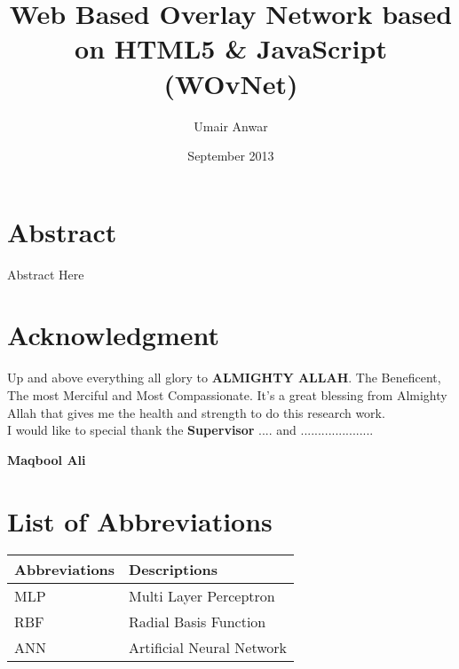 \documentclass[12pt,a4paper,oneside]{book} %
\title{Web Based Overlay Network based on HTML5 \& JavaScript (WOvNet)}
\author{Umair Anwar}
\date{{September 2013}}
\begin{document}
\maketitle


\chapter*{Abstract}

Abstract Here

\certificateoforiginality
\chapter*{Acknowledgment}
Up and above everything all glory to {\bfseries ALMIGHTY ALLAH}. The Beneficent, The most Merciful and Most Compassionate. It's a great blessing from Almighty Allah that gives me the health and strength to do this research work.\\

I would like to special thank the {\bfseries Supervisor} .... and .....................\\

\begin{flushright} \textbf{Maqbool Ali} \end{flushright}

\tableofcontents
%
%
%
\chapter*{List of Abbreviations}

\begin{table}[h]
    \renewcommand{\arraystretch}{1.3}
    \label{table:table1}
     \begin{tabular}{ll}
        \hline\hline
            {\bfseries Abbreviations} & {\bfseries Descriptions} \\
            \hline                                      %
            MLP & Multi Layer Perceptron  \\
            RBF & Radial Basis Function \\
            ANN & Artificial Neural Network  \\
            \hline                          %
    \end{tabular}
\end{table}
\end{document}
